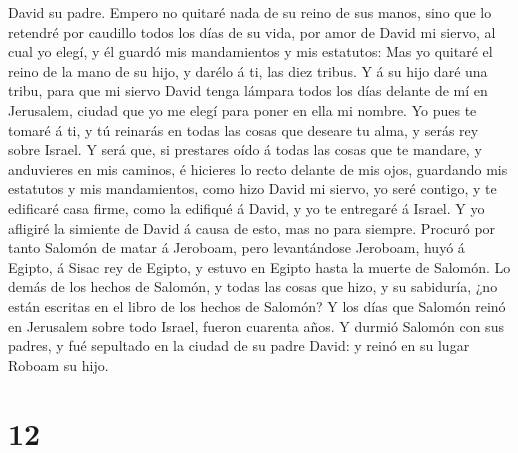 David su padre.  Empero no quitaré nada de su reino de
sus manos, sino que lo retendré por caudillo todos los días de su vida,
por amor de David mi siervo, al cual yo elegí, y él guardó mis
mandamientos y mis estatutos:  Mas yo quitaré el reino de
la mano de su hijo, y darélo á ti, las diez tribus.  Y á
su hijo daré una tribu, para que mi siervo David tenga lámpara todos los
días delante de mí en Jerusalem, ciudad que yo me elegí para poner en
ella mi nombre.  Yo pues te tomaré á ti, y tú reinarás en
todas las cosas que deseare tu alma, y serás rey sobre Israel.
 Y será que, si prestares oído á todas las cosas que te
mandare, y anduvieres en mis caminos, é hicieres lo recto delante de mis
ojos, guardando mis estatutos y mis mandamientos, como hizo David mi
siervo, yo seré contigo, y te edificaré casa firme, como la edifiqué á
David, y yo te entregaré á Israel.  Y yo afligiré la
simiente de David á causa de esto, mas no para siempre. 
Procuró por tanto Salomón de matar á Jeroboam, pero levantándose
Jeroboam, huyó á Egipto, á Sisac rey de Egipto, y estuvo en Egipto hasta
la muerte de Salomón.  Lo demás de los hechos de Salomón,
y todas las cosas que hizo, y su sabiduría, ¿no están escritas en el
libro de los hechos de Salomón?  Y los días que Salomón
reinó en Jerusalem sobre todo Israel, fueron cuarenta años.
 Y durmió Salomón con sus padres, y fué sepultado en la
ciudad de su padre David: y reinó en su lugar Roboam su hijo.

\hypertarget{section-11}{%
\section{12}\label{section-11}}

